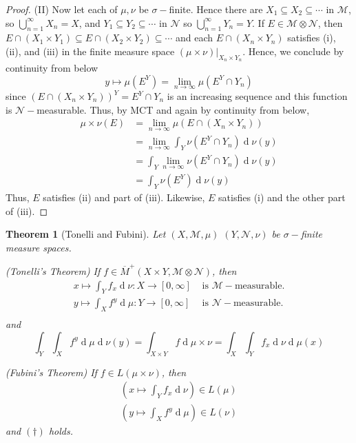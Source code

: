 \documentclass[12pt, a4paper]{memoir}
\newtheorem{theorem}{Theorem}[section]
\theoremstyle{nonumberplain}
\newtheorem{proof}{Proof}
\renewcommand{\d}[1]{\ensuremath{\operatorname{d}\!{#1}}} %
\begin{document}
\begin{proof}
    (II) Now let each of $\mu,\nu$ be $\sigma-$finite.
    Hence there are $X_1\subseteq X_2\subseteq\cdots$ in $\mathcal{M}$, so $\bigcup_{n=1}^\infty X_n=X$, and $Y_1\subseteq Y_2\subseteq\cdots$ in $\mathcal{N}$ so $\bigcup_{n=1}^\infty Y_n=Y$.
    If $E\in\mathcal{M}\otimes\mathcal{N}$, then $E\cap(X_1\times Y_1)\subseteq E\cap(X_2\times Y_2)\subseteq\cdots$ and each $E\cap(X_n\times Y_n)$ satisfies (i), (ii), and (iii) in the finite measure space $(\mu\times\nu)|_{X_n\times Y_n}$.
    Hence, we conclude by continuity from below
    \begin{equation*}
        y\mapsto\mu(E^Y)=\lim_{n\to\infty}\mu(E^Y\cap Y_n)
    \end{equation*}
    since $\left(E\cap(X_n\times Y_n)\right)^Y=E^Y\cap Y_n$ is an increasing sequence and this function is $\mathcal{N}-$measurable.
    Thus, by MCT and again by continuity from below,
    \begin{align*}
        \mu\times\nu(E) &= \lim_{n\to\infty}\mu(E\cap(X_n\times Y_n))\\
                        &= \lim_{n\to\infty}\int_Y\nu(E^Y\cap Y_n)\d{\nu(y)}\\
                        &= \int_Y\lim_{n\to\infty}\nu(E^Y\cap Y_n)\d{\nu(y)}\\
                        &= \int_Y\nu(E^Y)\d{\nu(y)}
    \end{align*}
    Thus, $E$ satisfies (ii) and part of (iii).
    Likewise, $E$ satisfies (i) and the other part of (iii).
\end{proof}
\begin{theorem}[Tonelli and Fubini]
    Let $(X,\mathcal{M},\mu)$ $(Y,\mathcal{N},\nu)$ be $\sigma-$finite measure spaces.

    (\textit{Tonelli's Theorem}) If $f\in\overline{M}^+(X\times Y,\mathcal{M}\otimes\mathcal{N})$, then
    \begin{align*}
        x\mapsto \int_Y f_x\d{\nu}:X\to[0,\infty]&\text{ is $\mathcal{M}-$measurable.}\\
        y\mapsto \int_X f^y\d{\mu}:Y\to[0,\infty]&\text{ is $\mathcal{N}-$measurable.}\\
    \end{align*}
    and
    \begin{equation*}
        \int_Y\int_X f^y\d{\mu}\d{\nu(y)}=\int_{X\times Y}f\d{\mu\times\nu}=\int_X\int_Yf_x\d{\nu}\d{\mu(x)}\tag{$\dagger$}
    \end{equation*}

    (\textit{Fubini's Theorem}) If $f\in L(\mu\times\nu)$, then
    \begin{align*}
        \left(x\mapsto\int_Yf_x\d{\nu}\right)\in L(\mu)\\
        \left(y\mapsto\int_Xf^y\d{\mu}\right)\in L(\nu)
    \end{align*}
    and $(\dagger)$ holds.
\end{theorem}
\end{document}
